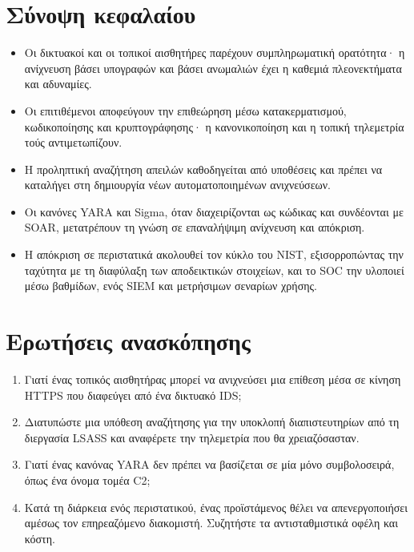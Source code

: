 \documentclass[11pt,openany]{book}
\begin{document}
\section*{Σύνοψη κεφαλαίου}
\begin{itemize}
  \item Οι δικτυακοί και οι τοπικοί αισθητήρες παρέχουν συμπληρωματική ορατότητα· η ανίχνευση βάσει υπογραφών και βάσει ανωμαλιών έχει η καθεμιά πλεονεκτήματα και αδυναμίες.
  \item Οι επιτιθέμενοι αποφεύγουν την επιθεώρηση μέσω κατακερματισμού, κωδικοποίησης και κρυπτογράφησης· η κανονικοποίηση και η τοπική τηλεμετρία τούς αντιμετωπίζουν.
  \item Η προληπτική αναζήτηση απειλών καθοδηγείται από υποθέσεις και πρέπει να καταλήγει στη δημιουργία νέων αυτοματοποιημένων ανιχνεύσεων.
  \item Οι κανόνες YARA και Sigma, όταν διαχειρίζονται ως κώδικας και συνδέονται με SOAR, μετατρέπουν τη γνώση σε επαναλήψιμη ανίχνευση και απόκριση.
  \item Η απόκριση σε περιστατικά ακολουθεί τον κύκλο του NIST, εξισορροπώντας την ταχύτητα με τη διαφύλαξη των αποδεικτικών στοιχείων, και το SOC την υλοποιεί μέσω βαθμίδων, ενός SIEM και μετρήσιμων σεναρίων χρήσης.
\end{itemize}

\section*{Ερωτήσεις ανασκόπησης}
\begin{enumerate}
  \item Γιατί ένας τοπικός αισθητήρας μπορεί να ανιχνεύσει μια επίθεση μέσα σε κίνηση HTTPS που διαφεύγει από ένα δικτυακό IDS;
  \item Διατυπώστε μια υπόθεση αναζήτησης για την υποκλοπή διαπιστευτηρίων από τη διεργασία LSASS και αναφέρετε την τηλεμετρία που θα χρειαζόσασταν.
  \item Γιατί ένας κανόνας YARA δεν πρέπει να βασίζεται σε μία μόνο συμβολοσειρά, όπως ένα όνομα τομέα C2;
  \item Κατά τη διάρκεια ενός περιστατικού, ένας προϊστάμενος θέλει να απενεργοποιήσει αμέσως τον επηρεαζόμενο διακομιστή. Συζητήστε τα αντισταθμιστικά οφέλη και κόστη.
\end{enumerate}

\end{document}
